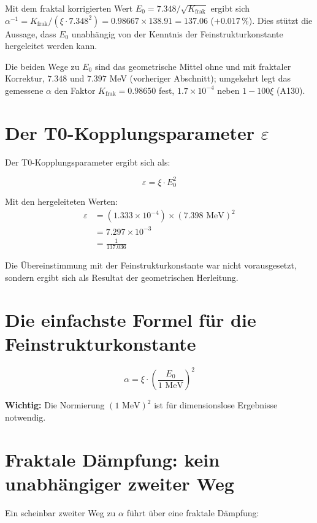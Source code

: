 	Mit dem fraktal korrigierten Wert $E_0 = 7.348/\sqrt{K_{\text{frak}}}$ ergibt sich $\alpha^{-1} = K_{\text{frak}}/(\xi \cdot 7.348^2) = 0.98667 \times 138.91 = 137.06$ ($+0.017\,\%$). Dies stützt die Aussage, dass $E_0$ unabhängig von der Kenntnis der Feinstrukturkonstante hergeleitet werden kann.
	
	Die beiden Wege zu $E_0$ sind das geometrische Mittel ohne und mit fraktaler Korrektur, $7.348$ und $7.397$ MeV (vorheriger Abschnitt); umgekehrt legt das gemessene $\alpha$ den Faktor $K_{\text{frak}} = 0.98650$ fest, $1.7\times10^{-4}$ neben $1 - 100\xi$ (A130).
	
	\section{Der T0-Kopplungsparameter $\varepsilon$}
	
	Der T0-Kopplungsparameter ergibt sich als:
	
	\begin{equation}
		\varepsilon = \xi \cdot E_0^2
	\end{equation}
	
	Mit den hergeleiteten Werten:
	\begin{align}
		\varepsilon &= (1.333 \times 10^{-4}) \times (7.398 \text{ MeV})^2\\
		&= 7.297 \times 10^{-3}\\
		&= \frac{1}{137.036}
	\end{align}
	
	Die Übereinstimmung mit der Feinstrukturkonstante war nicht vorausgesetzt, sondern ergibt sich als Resultat der geometrischen Herleitung.
	\section*{Die einfachste Formel für die Feinstrukturkonstante}

\[
\boxed{\alpha = \xi \cdot \left(\frac{E_0}{1 \text{ MeV}}\right)^2}
\]
\begin{tcolorbox}[colback=red!5!white,colframe=red!75!black]
	\textbf{Wichtig:} Die Normierung $(1 \text{ MeV})^2$ ist für dimensionslose Ergebnisse notwendig.
\end{tcolorbox}	
	\section{Fraktale Dämpfung: kein unabhängiger zweiter Weg}
	
	Ein scheinbar zweiter Weg zu $\alpha$ führt über eine fraktale Dämpfung:
	
